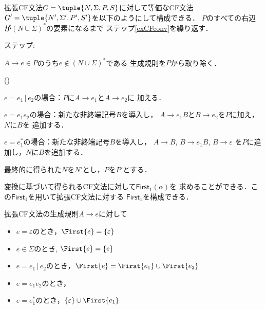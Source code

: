 \documentclass[dvipdfmx,a4j]{jbook}
\newcounter{coffee}
\newcounter{bean}
\begin{document}
\begin{Alg}
  拡張CF文法$G=\tuple{N,\Sigma,P,S}$に対して等価なCF文法$G'=
  \tuple{N',\Sigma',P',S'}$を以下のようにして構成できる．
  $P$のすべての右辺が$(N\cup\Sigma)^\ast$の要素になるまで
  ステップ\ref{exCFconv}を繰り返す．
  \begin{list}{ステップ:}{}
    \item\label{exCFconv} $A\rightarrow e\in P$のうち$e\notin(N\cup\Sigma)^\ast$である
    生成規則を$P$から取り除く．
    \begin{list}{()}{}
      \item $e=e_1\,|\,e_2$の場合：$P$に$A\rightarrow e_1$と$A\rightarrow e_2$に
      加える．
      \item $e=e_1e_2$の場合：新たな非終端記号$B$を導入し，
      $A\rightarrow e_1B$と$B\rightarrow e_2$を$P$に加え，$N$に$B$を
      追加する．
      \item $e=e_1^\ast$の場合：新たな非終端記号$B$を導入し，
      $A\rightarrow B$, $B\rightarrow e_1B$, $B\rightarrow\varepsilon$
      を$P$に追加し，$N$に$B$を追加する．
    \end{list}
  \end{list}
  最終的に得られた$N$を$N'$とし，$P$を$P'$とする．
\end{Alg}

変換に基づいて得られるCF文法に対して$\mathsf{First}_1(\alpha)$を
求めることができる．この$\mathsf{First}_1$を用いて拡張CF文法に対する
$\mathsf{First}_1$を構成できる．

\begin{Def}
  拡張CF文法の生成規則$A\rightarrow e$に対して
  \begin{itemize}
    \item $e=\varepsilon$のとき，$\First{e}=\{\varepsilon\}$
    \item $e\in\Sigma$のとき, $\First{e}=\{e\}$
    \item $e=e_1\,|\,e_2$のとき，$\First{e}=\First{e_1}\cup\First{e_2}$
    \item $e=e_1 e_2$のとき，
    \item $e=e_1^\ast$のとき，$\{\varepsilon\}\cup\First{e_1}$
  \end{itemize}
\end{Def}
\end{document}
